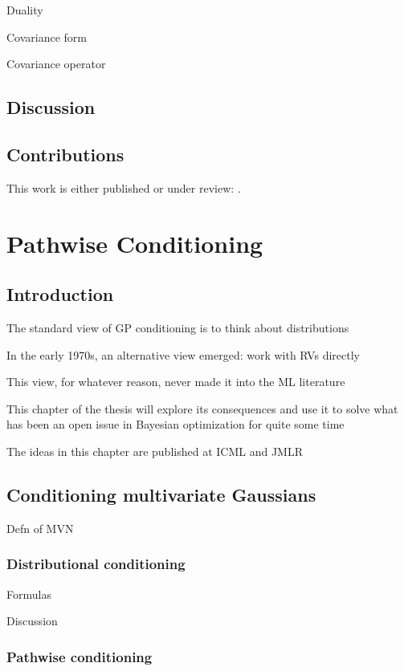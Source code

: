 \documentclass[11pt]{book}
\begin{document}
Duality

Covariance form

Covariance operator

\section{Discussion}

\section{Contributions}

This work is either published or under review: \textcite{wilson20,borovitskiy20,borovitskiy21,wilson21,hutchinson21}.



\chapter{Pathwise Conditioning}
\label{ch:pathwise}

\section{Introduction}

The standard view of GP conditioning is to think about distributions

In the early 1970s, an alternative view emerged: work with RVs directly

This view, for whatever reason, never made it into the ML literature

This chapter of the thesis will explore its consequences and use it to solve what has been an open issue in Bayesian optimization for quite some time

The ideas in this chapter are published at ICML and JMLR

\section{Conditioning multivariate Gaussians}

Defn of MVN

\subsection{Distributional conditioning}

Formulas

Discussion

\subsection{Pathwise conditioning}
\end{document}
